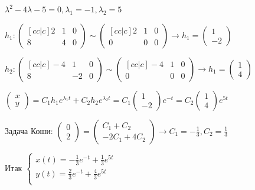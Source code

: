 \documentclass[12pt]{article}
\begin{document}
    $\displaystyle \lambda^2 - 4\lambda - 5 = 0, \lambda_1 = -1, \lambda_2 = 5$

    $\displaystyle h_1: \begin{pmatrix}[cc|c] 2 & 1 & 0 \\ 8 & 4 & 0\end{pmatrix} \sim \begin{pmatrix}[cc|c] 2 & 1 & 0 \\ 0 & 0 & 0\end{pmatrix} \to
    h_1 = \begin{pmatrix}1 \\ -2\end{pmatrix}$

    $\displaystyle h_2: \begin{pmatrix}[cc|c] -4 & 1 & 0 \\ 8 & -2 & 0\end{pmatrix} \sim \begin{pmatrix}[cc|c] -4 & 1 & 0 \\ 0 & 0 & 0\end{pmatrix} \to
    h_1 = \begin{pmatrix}1 \\ 4\end{pmatrix}$

    $\displaystyle \begin{pmatrix}x \\ y\end{pmatrix} = C_1 h_1 e^{\lambda_1 t} + C_2 h_2 e^{\lambda_2 t} =
    C_1 \begin{pmatrix}1 \\ -2\end{pmatrix} e^{-t} = C_2 \begin{pmatrix}1 \\ 4\end{pmatrix} e^{5t}$

    Задача Коши: $\displaystyle \begin{pmatrix}0 \\ 2\end{pmatrix} = \begin{pmatrix}
                                                           C_1 + C_2 \\ -2C_1 + 4C_2
    \end{pmatrix} \to C_1 = -\frac{1}{3}, C_2 = \frac{1}{3}$

    Итак $\displaystyle \begin{cases}
              x(t) = -\frac{1}{3} e^{-t} + \frac{1}{3} e^{5t} \\
              y(t) = \frac{2}{3} e^{-t} + \frac{4}{3} e^{5t} \\
    \end{cases}$
\end{document}
